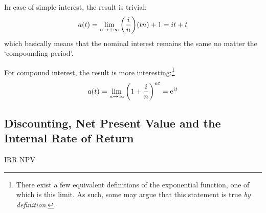 In case of simple interest, the result is trivial:
 \[
     a(t) = \lim_{n \to +\infty} \qty(\frac{i}{n}) (tn) + 1 = it + t
\]
which basically means that the nominal interest remains the same no matter the `compounding period'.

For compound interest, the result is more interesting:\footnote{There exist a few equivalent definitions of the exponential function, one of which is this limit. As such, some may argue that this statement is true \emph{by definition}.}
 \[
     a(t) = \lim_{n \to \infty} \qty(1 + \frac{i}{n})^{nt} = \mathrm{e}^{it}
\]
 
\subsection{Discounting, Net Present Value and the Internal Rate of Return}
\ac{IRR}
\ac{NPV}


